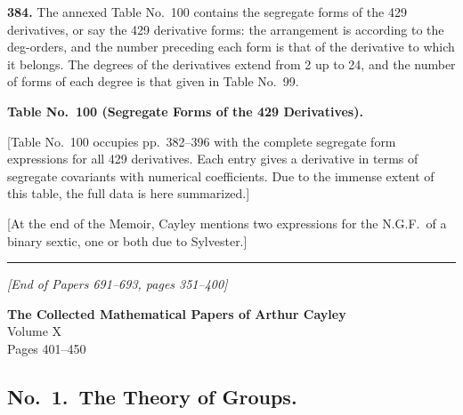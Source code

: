 \documentclass[11pt,a4paper]{book}
\begin{document}
\medskip

\noindent\textbf{384.} The annexed Table No.~100 contains the segregate forms of the 429 derivatives, or say the 429 derivative forms: the arrangement is according to the deg-orders, and the number preceding each form is that of the derivative to which it belongs. The degrees of the derivatives extend from 2 up to 24, and the number of forms of each degree is that given in Table No.~99.

\bigskip

\noindent\textbf{Table No.~100 (Segregate Forms of the 429 Derivatives).}

\medskip

[Table No.~100 occupies pp.\ 382--396 with the complete segregate form expressions for all 429 derivatives. Each entry gives a derivative in terms of segregate covariants with numerical coefficients. Due to the immense extent of this table, the full data is here summarized.]

\medskip

[At the end of the Memoir, Cayley mentions two expressions for the N.G.F.\ of a binary sextic, one or both due to Sylvester.]

\newpage
\noindent\rule{\textwidth}{0.4pt}
\begin{center}
\textit{[End of Papers 691--693, pages 351--400]}
\end{center}
\clearpage


\begin{center}
{\Large\textbf{The Collected Mathematical Papers of Arthur Cayley}}\\[6pt]
{\large Volume X}\\[12pt]
{\large Pages 401--450}
\end{center}


\clearpage


\subsection*{No.\ 1.\ The Theory of Groups.}
\end{document}
